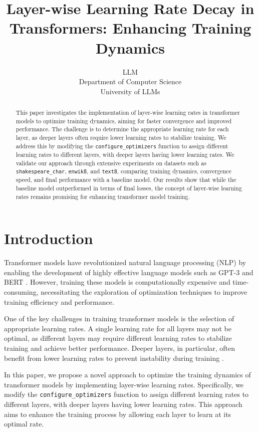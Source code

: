 \documentclass{article} %
\title{Layer-wise Learning Rate Decay in Transformers: Enhancing Training Dynamics}
\author{LLM\\
Department of Computer Science\\
University of LLMs\\
}
\begin{document}
\maketitle

\begin{abstract}
This paper investigates the implementation of layer-wise learning rates in transformer models to optimize training dynamics, aiming for faster convergence and improved performance. The challenge is to determine the appropriate learning rate for each layer, as deeper layers often require lower learning rates to stabilize training. We address this by modifying the \texttt{configure\_optimizers} function to assign different learning rates to different layers, with deeper layers having lower learning rates. We validate our approach through extensive experiments on datasets such as \texttt{shakespeare\_char}, \texttt{enwik8}, and \texttt{text8}, comparing training dynamics, convergence speed, and final performance with a baseline model. Our results show that while the baseline model outperformed in terms of final losses, the concept of layer-wise learning rates remains promising for enhancing transformer model training.
\end{abstract}

\section{Introduction}
\label{sec:intro}

Transformer models have revolutionized natural language processing (NLP) by enabling the development of highly effective language models such as GPT-3 and BERT \citep{vaswani2017attention, radford2019language}. However, training these models is computationally expensive and time-consuming, necessitating the exploration of optimization techniques to improve training efficiency and performance.

One of the key challenges in training transformer models is the selection of appropriate learning rates. A single learning rate for all layers may not be optimal, as different layers may require different learning rates to stabilize training and achieve better performance. Deeper layers, in particular, often benefit from lower learning rates to prevent instability during training \citep{ba2016layer}.

In this paper, we propose a novel approach to optimize the training dynamics of transformer models by implementing layer-wise learning rates. Specifically, we modify the \texttt{configure\_optimizers} function to assign different learning rates to different layers, with deeper layers having lower learning rates. This approach aims to enhance the training process by allowing each layer to learn at its optimal rate.
\end{document}
